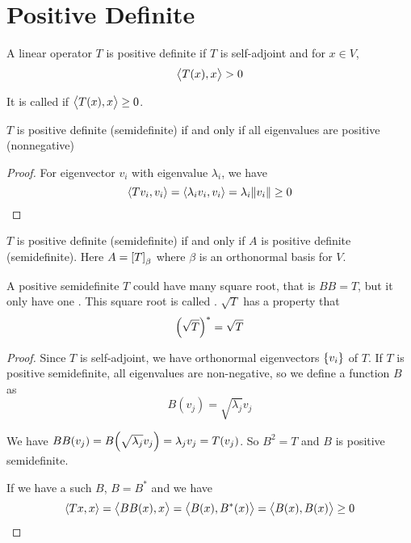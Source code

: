 \section{Positive Definite}

\begin{definition}
    A linear operator $T$ is positive definite if $T$ is self-adjoint and for $x \in V$,
    \begin{equation}
        \innerproduct{T(x)}{x} > 0
    \end{equation}
    
    It is called  if $\innerproduct{T(x)}{x} \geq 0$.
\end{definition}

\begin{theorem}
    $T$ is positive definite (semidefinite) if and only if all eigenvalues are positive (nonnegative)
\end{theorem}
\begin{proof}
    For eigenvector $v_i$ with eigenvalue $\lambda_i$, we have 
    \begin{equation*}
        \innerproduct{Tv_i}{v_i} = \innerproduct{\lambda_i v_i}{v_i} = \lambda_i \norm{v_i} \geq 0
    \end{equation*}
\end{proof}

\begin{theorem}
$T$ is positive definite (semidefinite) if and only if $A$ is positive definite (semidefinite). Here $A = \coordinate{T}_\beta $ where $\beta$ is an orthonormal basis for $V$.
\end{theorem}


\begin{theorem}
   A positive semidefinite $T$ could have many square root, that is $BB = T$, but it only have one . This square root is called . $\sqrt{T}$ has a property that
   \begin{equation}
       \mleft(\sqrt{T}\mright)^* = \sqrt{T}
   \end{equation}   
\end{theorem}
\begin{proof}
    Since $T$ is self-adjoint, we have orthonormal eigenvectors $\set{v_i}$ of $T$. If $T$ is positive semidefinite, all eigenvalues are non-negative, so we define a function $B$ as
    \begin{equation*}
        B(v_j) = \sqrt{\lambda_j} v_j
    \end{equation*}
    
    We have $BB(v_j) = B\mleft(\sqrt{\lambda_j} v_j\mright) = \lambda_j v_j = T(v_j)$. So $B^2= T$ and $B$ is positive semidefinite.
    
    If we have a such $B$, $B=B^*$ and we have
    \begin{equation*}
        \innerproduct{Tx}{x} = \innerproduct{BB(x)}{x} = \innerproduct{B(x)}{B^*(x)} = \innerproduct{B(x)}{B(x)} \geq 0
    \end{equation*}
    
\end{proof}



